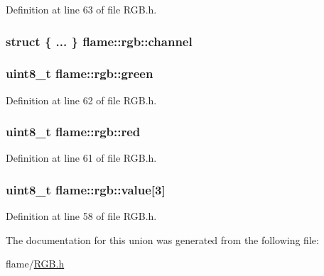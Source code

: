 Definition at line 63 of file R\-G\-B.\-h.

\hypertarget{unionflame_1_1rgb_a796ab03a8c63b315b7d60d3f87196370}{
\subsubsection[{channel}]{\setlength{\rightskip}{0pt plus 5cm}struct \{ ... \}   flame\-::rgb\-::channel}}\label{unionflame_1_1rgb_a796ab03a8c63b315b7d60d3f87196370}
\hypertarget{unionflame_1_1rgb_ac6314c6f3c99686284bfa185573b3e61}{
\subsubsection[{green}]{\setlength{\rightskip}{0pt plus 5cm}uint8\-\_\-t flame\-::rgb\-::green}}\label{unionflame_1_1rgb_ac6314c6f3c99686284bfa185573b3e61}


Definition at line 62 of file R\-G\-B.\-h.

\hypertarget{unionflame_1_1rgb_aff02b9e474353728fa5d75ebe72a3054}{
\subsubsection[{red}]{\setlength{\rightskip}{0pt plus 5cm}uint8\-\_\-t flame\-::rgb\-::red}}\label{unionflame_1_1rgb_aff02b9e474353728fa5d75ebe72a3054}


Definition at line 61 of file R\-G\-B.\-h.

\hypertarget{unionflame_1_1rgb_a0a54852e8a0ef4113a1bdbc19c558008}{
\subsubsection[{value}]{\setlength{\rightskip}{0pt plus 5cm}uint8\-\_\-t flame\-::rgb\-::value\mbox{[}3\mbox{]}}}\label{unionflame_1_1rgb_a0a54852e8a0ef4113a1bdbc19c558008}


Definition at line 58 of file R\-G\-B.\-h.



The documentation for this union was generated from the following file\-:\begin{DoxyCompactItemize}
\item 
flame/\hyperlink{_r_g_b_8h}{R\-G\-B.\-h}\end{DoxyCompactItemize}
